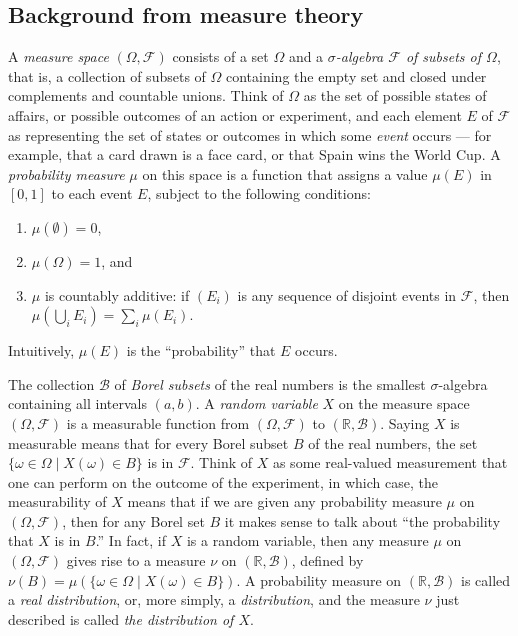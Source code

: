 \documentclass{svjour3}
\newcommand{\RR}{\mathbb{R}}
\newcommand{\mdl}[1]{{\mathcal #1}} %
\begin{document}
\subsection{Background from measure theory}
\label{subsection:background}

A \emph{measure space} $(\Omega, \mdl F)$ consists of a set $\Omega$ and a \emph{$\sigma$-algebra $\mdl F$ of subsets of $\Omega$}, that is, a collection of subsets of $\Omega$ containing the empty set and closed under complements and countable unions. Think of $\Omega$ as the set of possible states of affairs, or possible outcomes of an action or experiment, and each element $E$ of $\mdl F$ as representing the set of states or outcomes in which some \emph{event} occurs --- for example, that a card drawn is a face card, or that Spain wins the World Cup. A \emph{probability measure} $\mu$ on this space is a function that assigns a value $\mu(E)$ in $[0, 1]$ to each event $E$, subject to the following conditions:
\begin{enumerate}
 \item $\mu(\emptyset) = 0$,
 \item $\mu(\Omega) = 1$, and
 \item $\mu$ is countably additive: if $(E_i)$ is any sequence of disjoint events in $\mdl F$, then $\mu(\bigcup_i E_i) = \sum_i \mu(E_i)$.
\end{enumerate}
Intuitively, $\mu(E)$ is the ``probability'' that $E$ occurs.

The collection $\mdl B$ of \emph{Borel subsets} of the real numbers is the smallest $\sigma$-algebra containing all intervals $(a, b)$. A \emph{random variable} $X$ on the measure space $(\Omega, \mdl F)$ is a measurable function from $(\Omega, \mdl F)$ to $(\RR, \mdl B)$. Saying $X$ is measurable means that for every Borel subset $B$ of the real numbers, the set $\{ \omega \in \Omega \; | \; X(\omega) \in B \}$ is in $\mdl F$. Think of $X$ as some real-valued measurement that one can perform on the outcome of the experiment, in which case, the measurability of $X$ means that if we are given any probability measure $\mu$ on $(\Omega, \mdl F)$, then for any Borel set $B$ it makes sense to talk about ``the probability that $X$ is in $B$.'' In fact, if $X$ is a random variable, then any measure $\mu$ on $(\Omega, \mdl F)$ gives rise to a measure $\nu$ on $(\RR, \mdl B)$, defined by $\nu(B) = \mu ( \{ \omega \in \Omega \; | \; X (\omega) \in B \})$. A probability measure on $(\RR, \mdl B)$ is called a \emph{real distribution}, or, more simply, a \emph{distribution}, and the measure $\nu$ just described is called \emph{the distribution of $X$}.
\end{document}

